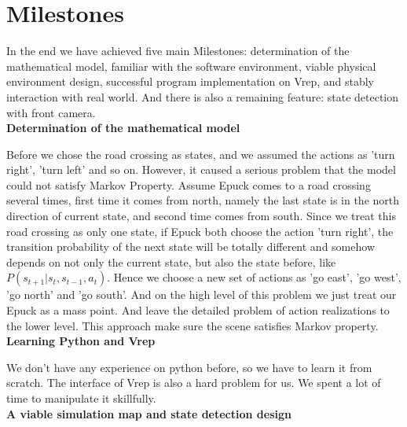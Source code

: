 \documentclass[a4paper, 11pt]{article} %
\begin{document}
\section{Milestones}
In the end we have achieved five main Milestones: determination of the mathematical
model, familiar with the software environment, viable physical environment design,
successful program implementation on Vrep, and stably interaction with real world.
And there is also a remaining feature: state detection with front camera.
\\[3ex]
\textbf{Determination of the mathematical model}

Before we
chose the road crossing as states, and we assumed the actions as 'turn right',
'turn left' and so on. However, it caused a serious problem that the model
could not satisfy Markov Property. Assume Epuck comes to a road crossing
several times, first time it comes from north, namely the last state is in the
north direction of current state, and second time comes from south. Since
we treat this road crossing as only one state, if Epuck both choose the action
'turn right', the transition probability of the next state will be totally different
and somehow depends on not only the current state, but also the state
before, like $P(s_{t+1}|s_t, s_{t-1}, a_t)$. Hence we choose a new set of actions
as 'go east', 'go west', 'go north' and 'go south'. And on the high level of
this problem we just treat our Epuck as a mass point. And leave the detailed
problem of action realizations to the lower level. This approach make sure the
scene satisfies Markov property.
\\[3ex]
\textbf{Learning Python and Vrep }

We don't have any experience on
python before, so we have to learn it from scratch. The interface of Vrep is also
a hard problem for us. We spent a lot of time to manipulate it skillfully.
\\[3ex]
\textbf{A viable simulation map and state detection design}
\end{document}
